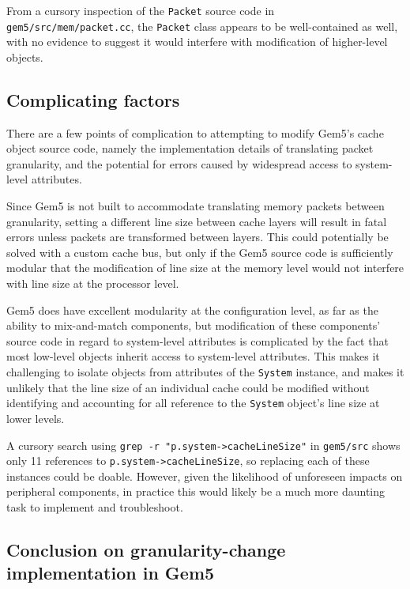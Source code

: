 \documentclass[12pt,twoside]{reedthesis}
\begin{document}
	From a cursory inspection of the \verb`Packet` source code in \verb`gem5/src/mem/packet.cc`, the \verb`Packet` class appears to be well-contained as well, with no evidence to suggest it would interfere with modification of higher-level objects.

	\subsection*{Complicating factors}

	There are a few points of complication to attempting to modify Gem5's cache object source code, namely the implementation details of translating packet granularity, and the potential for errors caused by widespread access to system-level attributes.
	
	Since Gem5 is not built to accommodate translating memory packets between granularity, setting a different line size between cache layers will result in fatal errors unless packets are transformed between layers. This could potentially be solved with a custom cache bus, but only if the Gem5 source code is sufficiently modular that the modification of line size at the memory level would not interfere with line size at the processor level.
	
	Gem5 does have excellent modularity at the configuration level, as far as the ability to mix-and-match components, but modification of these components' source code in regard to system-level attributes is complicated by the fact that most low-level objects inherit access to system-level attributes. This makes it challenging to isolate objects from attributes of the \verb`System` instance, and makes it unlikely that the line size of an individual cache could be modified without identifying and accounting for all reference to the \verb`System` object's line size at lower levels.

	A cursory search using \verb`grep -r "p.system->cacheLineSize"` in \verb`gem5/src` shows only 11 references to \verb`p.system->cacheLineSize`, so replacing each of these instances could be doable. However, given the likelihood of unforeseen impacts on peripheral components, in practice this would likely be a much more daunting task to implement and troubleshoot.

	\subsection*{Conclusion on granularity-change implementation in Gem5}
\end{document}
